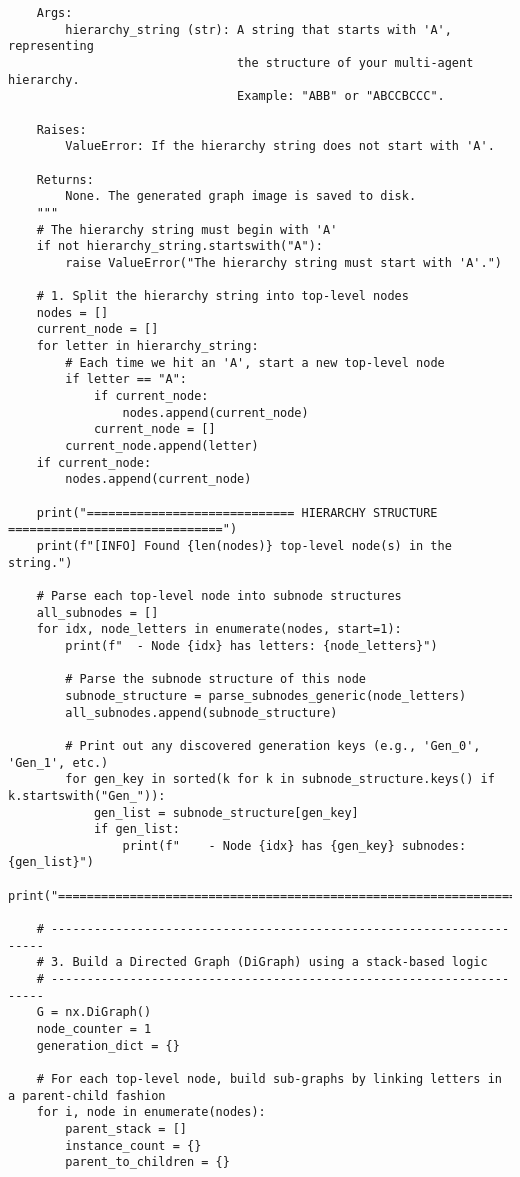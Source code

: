 \begin{lstlisting}
    Args:
        hierarchy_string (str): A string that starts with 'A', representing
                                the structure of your multi-agent hierarchy.
                                Example: "ABB" or "ABCCBCCC".

    Raises:
        ValueError: If the hierarchy string does not start with 'A'.

    Returns:
        None. The generated graph image is saved to disk.
    """
    # The hierarchy string must begin with 'A'
    if not hierarchy_string.startswith("A"):
        raise ValueError("The hierarchy string must start with 'A'.")

    # 1. Split the hierarchy string into top-level nodes
    nodes = []
    current_node = []
    for letter in hierarchy_string:
        # Each time we hit an 'A', start a new top-level node
        if letter == "A":
            if current_node:
                nodes.append(current_node)
            current_node = []
        current_node.append(letter)
    if current_node:
        nodes.append(current_node)

    print("============================= HIERARCHY STRUCTURE ==============================")
    print(f"[INFO] Found {len(nodes)} top-level node(s) in the string.")

    # Parse each top-level node into subnode structures
    all_subnodes = []
    for idx, node_letters in enumerate(nodes, start=1):
        print(f"  - Node {idx} has letters: {node_letters}")

        # Parse the subnode structure of this node
        subnode_structure = parse_subnodes_generic(node_letters)
        all_subnodes.append(subnode_structure)

        # Print out any discovered generation keys (e.g., 'Gen_0', 'Gen_1', etc.)
        for gen_key in sorted(k for k in subnode_structure.keys() if k.startswith("Gen_")):
            gen_list = subnode_structure[gen_key]
            if gen_list:
                print(f"    - Node {idx} has {gen_key} subnodes: {gen_list}")
    print("================================================================================\n")

    # ---------------------------------------------------------------------
    # 3. Build a Directed Graph (DiGraph) using a stack-based logic
    # ---------------------------------------------------------------------
    G = nx.DiGraph()
    node_counter = 1
    generation_dict = {}

    # For each top-level node, build sub-graphs by linking letters in a parent-child fashion
    for i, node in enumerate(nodes):
        parent_stack = []
        instance_count = {}
        parent_to_children = {}


\end{lstlisting}
